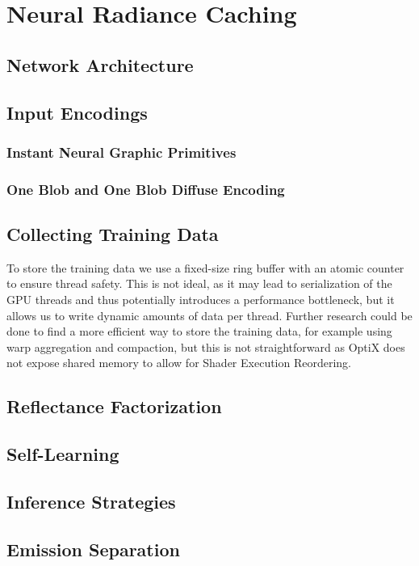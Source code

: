 
\chapter{Neural Radiance Caching}
\label{chap:nrc}

\section{Network Architecture}

\section{Input Encodings}

\subsection{Instant Neural Graphic Primitives}

\subsection{One Blob and One Blob Diffuse Encoding}

\section{Collecting Training Data}

To store the training data we use a fixed-size ring buffer with an atomic counter to ensure thread safety.
This is not ideal, as it may lead to serialization of the GPU threads and thus potentially introduces a performance bottleneck, but it allows us to write dynamic amounts of data per thread.
Further research could be done to find a more efficient way to store the training data, for example using warp aggregation and compaction, but this is not straightforward as OptiX does not expose shared memory to allow for Shader Execution Reordering.

\section{Reflectance Factorization}

\section{Self-Learning}

\section{Inference Strategies}

\section{Emission Separation}